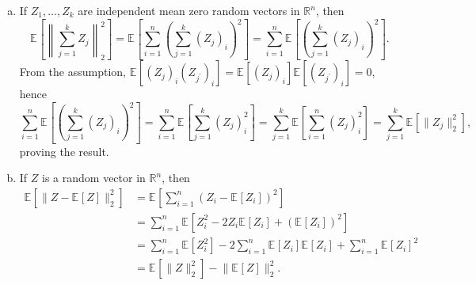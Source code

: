 \begin{answer}
	\begin{enumerate}[(a)]
		\item If \(Z_1, \dots , Z_k\) are independent mean zero random vectors in \(\mathbb{R} ^n\), then
		      \[
			      \mathbb{E}_{}\left[\left\lVert \sum_{j=1}^{k} Z_j \right\rVert _2^2 \right]
			      = \mathbb{E}_{}\left[ \sum_{i=1}^{n} \left( \sum_{j=1}^{k} (Z_j)_i \right) ^2 \right]
			      = \sum_{i=1}^{n} \mathbb{E}_{}\left[ \left( \sum_{j=1}^{k} (Z_j)_i \right) ^2 \right].
		      \]
		      From the assumption, \(\mathbb{E}_{}\left[(Z_j)_i (Z_{j^{\prime} })_i \right] = \mathbb{E}_{}\left[(Z_j)_i \right] \mathbb{E}_{}\left[(Z_{j^{\prime} })_i \right] = 0\), hence
		      \[
			      \sum_{i=1}^{n} \mathbb{E}_{}\left[ \left( \sum_{j=1}^{k} (Z_j)_i \right) ^2 \right]
			      = \sum_{i=1}^{n} \mathbb{E}_{}\left[ \sum_{j=1}^{k} (Z_j)_i^2 \right]
			      = \sum_{j=1}^{k} \mathbb{E}_{}\left[ \sum_{i=1}^{n} (Z_j)_i^2 \right]
			      = \sum_{j=1}^{k} \mathbb{E}_{}\left[ \lVert Z_j \rVert _2^2 \right],
		      \]
		      proving the result.
		\item If \(Z\) is a random vector in \(\mathbb{R} ^n\), then
		      \[
			      \begin{split}
				      \mathbb{E}_{}\left[\lVert Z - \mathbb{E}_{}\left[Z \right] \rVert _2^2 \right]
				       & = \mathbb{E}_{}\left[ \sum_{i=1}^{n} \left( Z_i - \mathbb{E}_{}\left[Z_i \right] \right) ^2 \right]                                                                                     \\
				       & = \sum_{i=1}^{n} \mathbb{E}_{}\left[ Z_i^2 - 2 Z_i \mathbb{E}_{}\left[Z_i \right] + (\mathbb{E}_{}\left[Z_i \right] )^2 \right]                                                         \\
				       & = \sum_{i=1}^{n} \mathbb{E}_{}\left[ Z_i^2 \right] - 2 \sum_{i=1}^{n} \mathbb{E}_{}\left[ Z_i \right] \mathbb{E}_{}\left[Z_i \right] + \sum_{i=1}^{n} \mathbb{E}_{}\left[Z_i \right] ^2 \\
				       & = \mathbb{E}_{}\left[\lVert Z \rVert _2^2 \right] - \lVert \mathbb{E}_{}\left[Z \right] \rVert _2^2.
			      \end{split}
		      \]
	\end{enumerate}
\end{answer}

